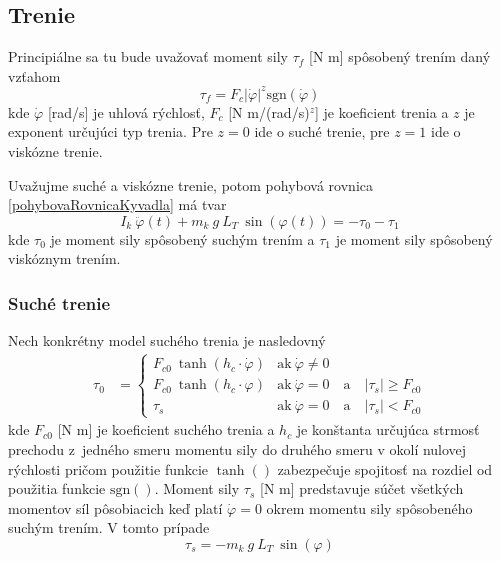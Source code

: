\documentclass[a4paper, 10pt, ]{article}
\begin{document}
\subsection{Trenie}

Principiálne sa tu bude uvažovať moment sily $\tau_f$ [N m] spôsobený trením daný vzťahom
\begin{equation}
    \tau_f = F_{c} \left| \dot \varphi \right|^{z} \text{sgn}(\dot \varphi) 
\end{equation}
kde $\dot \varphi$ [rad/s] je uhlová rýchlosť, $F_{c}$ [N m/(rad/s)$^z$] je koeficient trenia a $z$ je exponent určujúci typ trenia. Pre $z = 0$ ide o suché trenie, pre $z = 1$ ide o viskózne trenie.

Uvažujme suché a viskózne trenie, potom pohybová rovnica \eqref{pohybovaRovnicaKyvadla} má tvar
\begin{equation} \label{pohybovaRovnicaKyvadlaTrenie}
    I_k \  \ddot\varphi(t) + m_k \  g \   L_T \  \sin(\varphi(t)) = - \tau_0 - \tau_1
\end{equation}
kde $\tau_0$ je moment sily spôsobený suchým trením a $\tau_1$ je moment sily spôsobený viskóznym trením.


\subsubsection{Suché trenie}

Nech konkrétny model suchého trenia je nasledovný
\begin{align} \label{modelSuchehoTrenia}
    \tau_0 &= 
    \begin{cases} 
        F_{c0} \ \tanh(h_c\cdot \dot \varphi) & \text{ak}   \ \dot \varphi \neq 0  \\
        F_{c0} \ \tanh(h_c\cdot      \varphi) & \text{ak}   \ \dot \varphi = 0 \quad \text{a} \quad \left|\tau_s\right| \geq F_{c0} \\
        \tau_s &  \text{ak}  \ \dot \varphi = 0 \quad \text{a} \quad \left|\tau_s\right| < F_{c0}
    \end{cases}         
\end{align}
kde $F_{c0}$ [N m] je koeficient suchého trenia a $h_c$ je konštanta určujúca strmosť prechodu z~jedného smeru momentu sily do druhého smeru v okolí nulovej rýchlosti pričom použitie funkcie $\tanh()$ zabezpečuje spojitosť na rozdiel od použitia funkcie $\text{sgn}()$. 
Moment sily $\tau_s$ [N m] predstavuje súčet všetkých momentov síl pôsobiacich keď platí $\dot \varphi = 0$ okrem momentu sily spôsobeného suchým trením. V tomto prípade
\begin{equation}
    \tau_s = - m_k \ g \ L_T  \ \sin(\varphi)
\end{equation}
\end{document}

